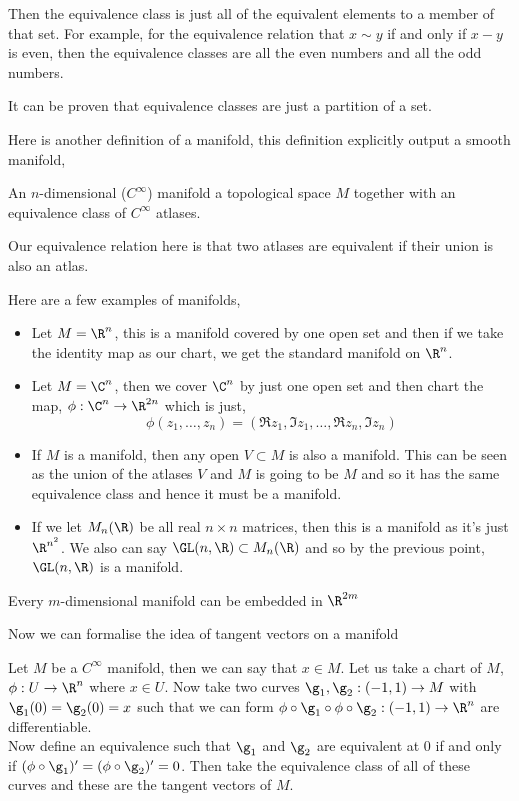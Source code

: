 Then the equivalence class is just all of the equivalent elements to a member of that set. For example, for the equivalence relation that $x \sim y$ if and only if $x - y$ is even, then the equivalence classes are all the even numbers and all the odd numbers.

\begin{remark}
   It can be proven that equivalence classes are just a partition of a set. \cite{Buzzard-2020}
\end{remark}

Here is another definition of a manifold, this definition explicitly output a smooth manifold,
\begin{ndefi}
  An $n$-dimensional ($C^\infty$) manifold a topological space $M$ together with an equivalence class of $C^\infty$ atlases.
\end{ndefi}
\begin{remark}
   Our equivalence relation here is that two atlases are equivalent if their union is also an atlas.
\end{remark}

Here are a few examples of manifolds,
\begin{itemize}
  \item Let $M = \R^n$, this is a manifold covered by one open set and then if we take the identity map as our chart, we get the standard manifold on $\R^n$.
  \item Let $M = \C^n$, then we cover $\C^n$ by just one open set and then chart the map, $\phi : \C^n \to \R^{2n}$ which is  just,
  $$ \phi (z_1, \dots, z_n) = (\Re z_1, \Im z_1, \dots, \Re z_n, \Im z_n) $$
  \item If $M$ is a manifold, then any open $V \subset M$ is also a manifold. This can be seen as the union of the atlases $V$ and $M$ is going to be $M$ and so it has the same equivalence class and hence it must be a manifold.
  \item If we let $M_n (\R)$ be all real $n \times n$ matrices, then this is a manifold as it's just $\R^{n^2}$. We also can say $\GL(n, \R) \subset M_n(\R)$ and so by the previous point, $\GL(n, \R)$ is a manifold.
\end{itemize}

\begin{nthm}
  Every $m$-dimensional manifold can be embedded in $\R^{2m}$
\end{nthm}

\noindent
Now we can formalise the idea of tangent vectors on a manifold\cite{Lee-2009}
\begin{ndefi}
  Let $M$ be a $C^\infty$ manifold, then we can say that $x \in M$. Let us take a chart of $M$, $\phi : U \to \R^n$ where $x \in U$. Now take two curves $\g_1, \g_2 : (-1, 1) \to M$ with $\g_1(0) = \g_2(0) = x$ such that we can form $\phi \circ \g_1 \circ \phi \circ \g_2 : (-1, 1) \to \R^n$ are differentiable. \\
  Now define an equivalence such that $\g_1$ and $\g_2$ are equivalent at $0$ if and only if $(\phi \circ \g_1)' = (\phi \circ \g_2)' = 0$. Then take the equivalence class of all of these curves and these are the tangent vectors of $M$.
\end{ndefi}

